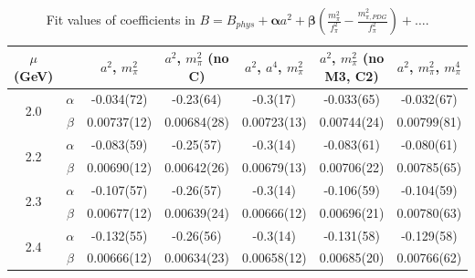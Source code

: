 \documentclass[12pt]{extarticle}
\begin{document}
\begin{table}[h!]
\begin{center}
\begin{tabular}{|c c|c|c|c|c|c|}
\hline
$\mu$ (GeV) &  & $a^2$, $m_\pi^2$& $a^2$, $m_\pi^2$ (no C)& $a^2$, $a^4$, $m_\pi^2$& $a^2$, $m_\pi^2$ (no M3, C2)& $a^2$, $m_\pi^2$, $m_\pi^4$\\
\hline
\multirow{2}{0.5in}{2.0} & $\alpha$ & -0.034(72)& -0.23(64)& -0.3(17)& -0.033(65)& -0.032(67)\\
 & $\beta$ & 0.00737(12)& 0.00684(28)& 0.00723(13)& 0.00744(24)& 0.00799(81)\\
\hline
\multirow{2}{0.5in}{2.2} & $\alpha$ & -0.083(59)& -0.25(57)& -0.3(14)& -0.083(61)& -0.080(61)\\
 & $\beta$ & 0.00690(12)& 0.00642(26)& 0.00679(13)& 0.00706(22)& 0.00785(65)\\
\hline
\multirow{2}{0.5in}{2.3} & $\alpha$ & -0.107(57)& -0.26(57)& -0.3(14)& -0.106(59)& -0.104(59)\\
 & $\beta$ & 0.00677(12)& 0.00639(24)& 0.00666(12)& 0.00696(21)& 0.00780(63)\\
\hline
\multirow{2}{0.5in}{2.4} & $\alpha$ & -0.132(55)& -0.26(56)& -0.3(14)& -0.131(58)& -0.129(58)\\
 & $\beta$ & 0.00666(12)& 0.00634(23)& 0.00658(12)& 0.00685(20)& 0.00766(62)\\
\hline
\end{tabular}
\caption{Fit values of coefficients in $B = B_{phys} + \mathbf{\alpha} a^2 + \mathbf{\beta}\left(\frac{m_\pi^2}{f_\pi^2}-\frac{m_{\pi,PDG}^2}{f_\pi^2}\right) + \ldots$.}
\end{center}
\end{table}




















\clearpage
\end{document}
